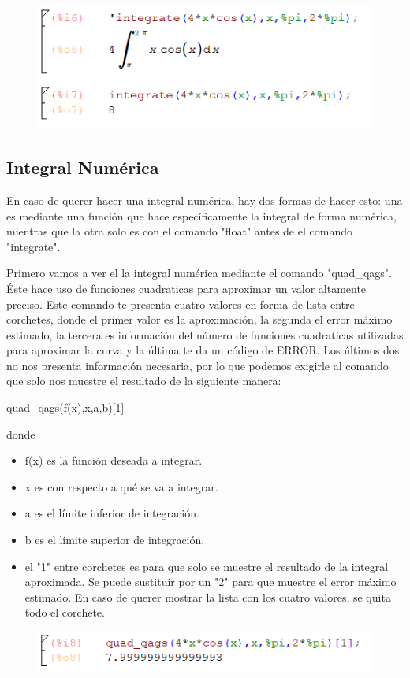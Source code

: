 \documentclass[a4paper]{article}
\begin{document}
\begin{figure}[h!]
  \centering
  \includegraphics[width=0.4\linewidth]{def_ej.PNG}
\end{figure}

\subsection{Integral Numérica}

En caso de querer hacer una integral numérica, hay dos formas de hacer esto: una es mediante una función que hace específicamente la integral de forma numérica, mientras que la otra solo es con el comando "float" antes de el comando "integrate".

Primero vamos a ver el la integral numérica mediante el comando "quad\_qags". Éste hace uso de funciones cuadraticas para aproximar un valor altamente preciso. Este comando te presenta cuatro valores en forma de lista entre corchetes, donde el primer valor es la aproximación, la segunda el error máximo estimado, la tercera es información del número de funciones cuadraticas utilizadas para aproximar la curva y la última te da un código de ERROR. Los últimos dos no nos presenta información necesaria, por lo que podemos exigirle al comando que solo nos muestre el resultado de la siguiente manera:

\begin{center}
quad\_qags(f(x),x,a,b)[1]
\end{center}
donde
\begin{itemize}
\item f(x) es la función deseada a integrar.
\item x es con respecto a qué se va a integrar. 
\item a es el límite inferior de integración.
\item b es el límite superior de integración.
\item el "1" entre corchetes es para que solo se muestre el resultado de la integral aproximada. Se puede sustituir por un "2" para que muestre el error máximo estimado. En caso de querer mostrar la lista con los cuatro valores, se quita todo el corchete. 
\end{itemize}

\begin{figure}[h!]
  \centering
  \includegraphics[width=0.4\linewidth]{numerico_ej.PNG}
\end{figure}
\end{document}
